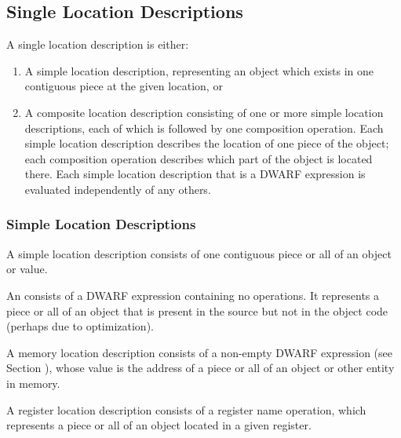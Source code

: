 \subsection{Single Location Descriptions}
A single location description is either:
\begin{enumerate}[1. ]
\item A simple location description, representing an object
which 
exists in one contiguous piece at the given location, or 
\item A composite location description consisting of one or more
simple location descriptions, each of which is followed by
one composition operation. Each simple location description
describes the location of one piece of the object; each
composition operation describes which part of the object is
located there. Each simple location description that is a
DWARF expression is evaluated independently of any others.
\bb\eb
\end{enumerate}



\subsubsection{Simple Location Descriptions}
A 
simple location description consists of one 
contiguous piece or all of an object or value.

\bb
{}
An 
consists of a DWARF expression
containing no operations. It represents a piece or all of an
object that is present in the source but not in the object code
(perhaps due to optimization).
\eb

A 
memory location description 
consists of a non-empty DWARF
expression (see 
Section ), 
whose value is the address of
a piece or all of an object or other entity in memory.

\label{chap:registerlocationdescriptions}
A register location description consists of a register name
operation, which represents a piece or all of an object
located in a given register.

